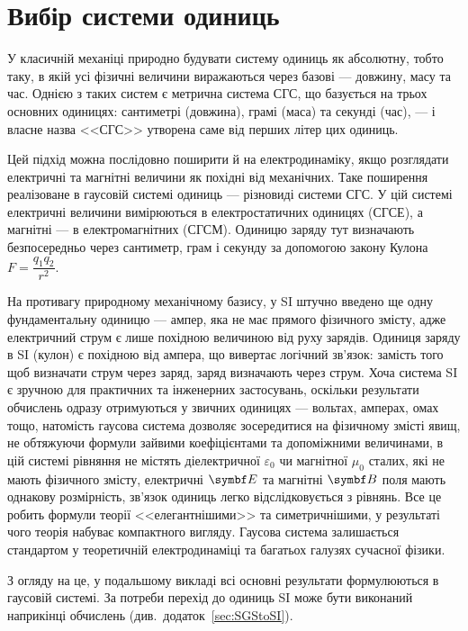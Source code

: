 

\chapter*{Вибір системи одиниць}\label{\currfilebase}

У класичній механіці природно будувати систему одиниць як абсолютну, тобто таку, в якій усі фізичні величини виражаються через базові --- довжину, масу та час. Однією з таких систем є метрична система СГС, що базується на трьох основних одиницях: сантиметрі (довжина), грамі (маса) та секунді (час), --- і власне назва <<СГС>> утворена саме від перших літер цих одиниць.

Цей підхід можна послідовно поширити й на електродинаміку, якщо розглядати електричні та магнітні величини як похідні від механічних. Таке поширення реалізоване в гаусовій системі одиниць --- різновиді системи СГС. У цій системі електричні величини вимірюються в електростатичних одиницях (СГСЕ), а магнітні --- в електромагнітних (СГСМ). Одиницю заряду тут визначають безпосередньо через сантиметр, грам і секунду за допомогою закону Кулона \(F = \dfrac{q_1 q_2}{r^2}\).

На противагу природному механічному базису, у SI штучно введено ще одну фундаментальну одиницю --- ампер, яка не має прямого фізичного змісту, адже електричний струм є лише похідною величиною від руху зарядів. Одиниця заряду в SI (кулон) є похідною від ампера, що вивертає логічний зв'язок: замість того щоб визначати струм через заряд, заряд визначають через струм. Хоча система SI є зручною для практичних та інженерних застосувань, оскільки результати обчислень одразу отримуються у звичних одиницях --- вольтах, амперах, омах тощо, натомість гаусова система дозволяє зосередитися на фізичному змісті явищ, не обтяжуючи формули зайвими коефіцієнтами та допоміжними величинами, в цій системі рівняння не містять діелектричної \( \varepsilon _{0}\) чи магнітної \(\mu _{0}\) сталих, які не мають фізичного змісту, електричні $\Efield$ та магнітні $\Bfield$ поля мають однакову розмірність, зв'язок одиниць легко відслідковується з рівнянь. Все це робить формули теорії <<елегантнішими>> та симетричнішими, у результаті чого теорія набуває компактного вигляду. Гаусова система залишається стандартом у теоретичній електродинаміці та багатьох галузях сучасної фізики.

З огляду на це, у подальшому викладі всі основні результати формулюються в гаусовій системі. За потреби перехід до одиниць SI може бути виконаний наприкінці обчислень (див.~додаток~\ref{sec:SGStoSI}).
